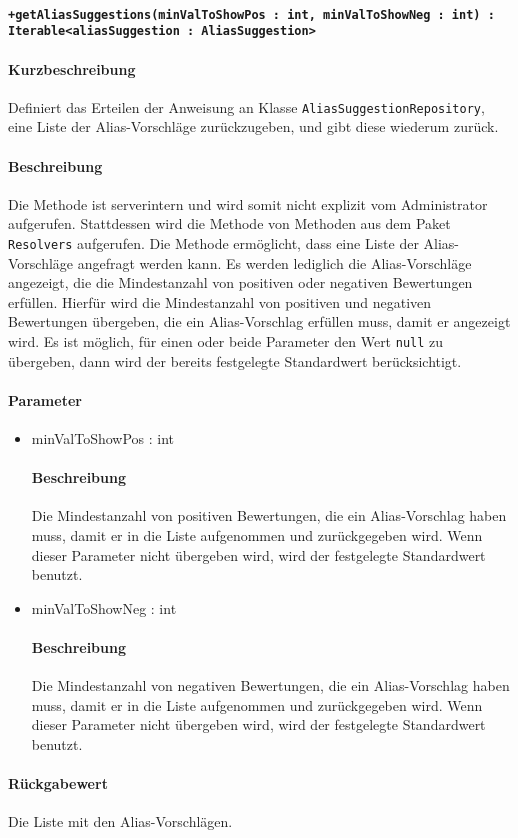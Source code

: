 \paragraph*{\texttt{+getAliasSuggestions(minValToShowPos : int, minValToShowNeg : int) : Iterable<aliasSuggestion : AliasSuggestion>}}%
\paragraph*{Kurzbeschreibung}
Definiert das Erteilen der Anweisung an Klasse \texttt{AliasSuggestionRepository}, eine Liste der Alias-Vorschläge zurückzugeben, und gibt diese wiederum zurück.
\paragraph*{Beschreibung}
Die Methode ist serverintern und wird somit nicht explizit vom Administrator aufgerufen.
Stattdessen wird die Methode von Methoden aus dem Paket \texttt{Resolvers} aufgerufen.
Die Methode ermöglicht, dass eine Liste der Alias-Vorschläge angefragt werden kann.
Es werden lediglich die Alias-Vorschläge angezeigt, die die Mindestanzahl von positiven oder negativen Bewertungen erfüllen.
Hierfür wird die Mindestanzahl von positiven und negativen Bewertungen übergeben, die ein Alias-Vorschlag erfüllen muss, damit er angezeigt wird.
Es ist möglich, für einen oder beide Parameter den Wert \texttt{null} zu übergeben, dann wird der bereits festgelegte Standardwert berücksichtigt.
\paragraph*{Parameter}
\begin{itemize}
	\item minValToShowPos : int
		\paragraph*{Beschreibung}
		Die Mindestanzahl von positiven Bewertungen, die ein Alias-Vorschlag haben muss, damit er in die Liste aufgenommen und zurückgegeben wird.
		Wenn dieser Parameter nicht übergeben wird, wird der festgelegte Standardwert benutzt.
	\item minValToShowNeg : int
		\paragraph*{Beschreibung}
		Die Mindestanzahl von negativen Bewertungen, die ein Alias-Vorschlag haben muss, damit er in die Liste aufgenommen und zurückgegeben wird. 
		Wenn dieser Parameter nicht übergeben wird, wird der festgelegte Standardwert benutzt.
\end{itemize}
\paragraph*{Rückgabewert}
Die Liste mit den Alias-Vorschlägen. 
